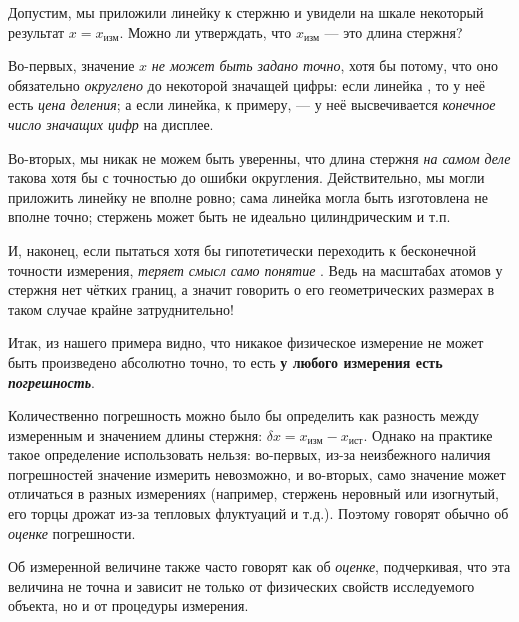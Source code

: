 Допустим, мы приложили линейку к стержню и увидели на шкале некоторый результат
$x=x_{\text{изм}}$. Можно ли утверждать, что $x_{\text{изм}}$ --- это длина
стержня?

Во-первых, значение $x$ \emph{не может быть задано точно}, хотя бы
потому, что оно обязательно \emph{округлено} до некоторой значащей
цифры: если линейка , то у неё
есть \emph{цена деления}; а если линейка, к примеру, 
--- у неё высвечивается \emph{конечное число значащих цифр}
на дисплее.

Во-вторых, мы никак не можем быть уверенны, что длина стержня \emph{на
самом деле} такова хотя бы с точностью до ошибки округления. Действительно,
мы могли приложить линейку не вполне ровно; сама линейка могла быть
изготовлена не вполне точно; стержень может быть не идеально цилиндрическим
и т.п.

И, наконец, если пытаться хотя бы гипотетически переходить к бесконечной
точности измерения, \emph{теряет смысл само понятие} . Ведь
на масштабах атомов у стержня нет чётких границ, а значит говорить о его
геометрических размерах в таком случае крайне затруднительно!

Итак, из нашего примера видно, что никакое физическое измерение не может быть
произведено абсолютно точно, то есть
\textbf{у любого измерения есть \emph{погрешность}}.%

Количественно погрешность можно было бы определить как разность между
измеренным и  значением длины стержня:
$\delta x=x_{\text{изм}}-x_{\text{ист}}$. Однако на практике такое определение
использовать нельзя: во-первых, из-за неизбежного наличия
погрешностей  значение измерить невозможно, и во-вторых, само
 значение может отличаться в разных измерениях (например, стержень
неровный или изогнутый, его торцы дрожат из-за тепловых флуктуаций и т.д.).
Поэтому говорят обычно об \emph{оценке} погрешности.

Об измеренной величине также часто говорят как об \emph{оценке}, подчеркивая,
что эта величина не точна и зависит не только от физических свойств
исследуемого объекта, но и от процедуры измерения.

